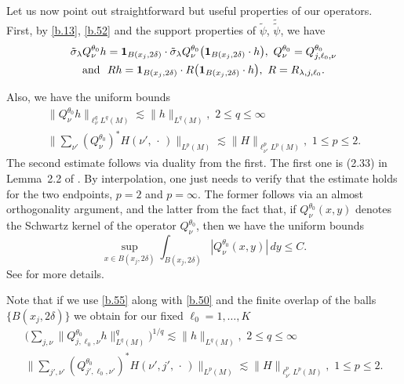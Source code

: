 \documentclass[10pt]{amsart}
\newcommand{\la}{\lambda}
\newcommand{\1}{{\bf 1}}
\begin{document}
Let us now point out straightforward but useful properties of our operators.  First, by \eqref{b.13}, \eqref{b.52}
and the support properties of $\tilde \psi$, $\tilde{\tilde \psi}$, we have
\begin{multline}\label{b.54}
\tilde \sigma_\la Q^{\theta_0}_\nu h=\1_{B(x_j,2\delta)} \cdot \tilde \sigma_\la Q^{\theta_0}_\nu\bigl(
\1_{B(x_j,2\delta)} \cdot h\bigr), \, \, Q^{\theta_0}_\nu =Q^{\theta_0}_{j,\ell_0,\nu}
\\
\text{and } \, \, Rh=\1_{B(x_j,2\delta)}\cdot R \bigl(
\1_{B(x_j,2\delta)} \cdot h\bigr), \, \, R=R_{\la,j,\ell_0}.
\end{multline}



Also, we have the uniform bounds
\begin{equation}\label{b.55}
\begin{split}
\|Q^{\theta_0}_\nu h\|_{\ell^q_\nu L^q(M)}\lesssim \|h\|_{L^q(M)}, \, \, 2\le q\le \infty
\\
\bigl\| \sum_{\nu'}(Q^{\theta_0}_\nu)^*H(\nu', \, \cdot \, )\|_{L^p(M)}\lesssim 
\|H\|_{\ell^p_{\nu'}L^p(M)}, \, \, 1\le p\le 2.
\end{split}
\end{equation}
The second estimate follows via duality from the first.  The first one is (2.33) in Lemma~2.2 of \cite{HSp}.  By interpolation,
one just needs to verify that the estimate holds for the two endpoints, $p=2$ and $p=\infty$.  The former follows via an almost
orthogonality argument, and the latter from the fact that, if $Q^{\theta_0}_\nu(x,y)$ denotes the Schwartz kernel of the operator $Q^{\theta_0}_\nu$, then  we have the uniform bounds
$$\sup_{x\in B(x_j,2\delta)}\int_{B(x_j,2\delta)}|Q^{\theta_0}_\nu(x,y)| \, dy\le C.$$
See \cite{HSp} for more details.


Note that if we use \eqref{b.55} along with \eqref{b.50} and the finite overlap of the balls $\{B(x_j,2\delta)\}$ we obtain
for our fixed $\ell_0=1,\dots,K$
\begin{equation}\label{b.555}
\begin{split}
\bigl(\sum_{j,\nu}\|Q^{\theta_0}_{j,\ell_0,\nu} h\|_{ L^q(M)}^q\bigr)^{1/q}\lesssim \|h\|_{L^q(M)}, \, \, 2\le q\le \infty
\\
\bigl\| \sum_{j',\nu'}(Q^{\theta_0}_{j',\ell_0,\nu'})^*H(\nu',j', \, \cdot \, )\|_{L^p(M)}\lesssim 
\|H\|_{\ell^p_{\nu'}L^p(M)}, \, \, 1\le p\le 2.
\end{split}
\end{equation}
\end{document}
